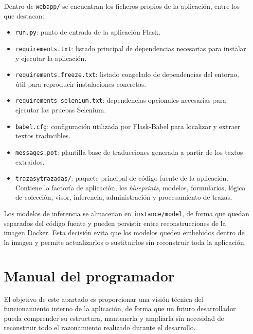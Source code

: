 Dentro de \texttt{webapp/} se encuentran los ficheros propios de la
aplicación, entre los que destacan:

\begin{itemize}
	\item \texttt{run.py}: punto de entrada de la aplicación Flask.
	
	\item \texttt{requirements.txt}: listado principal de dependencias necesarias para instalar y ejecutar la aplicación.
	
	\item \texttt{requirements.freeze.txt}: listado congelado de dependencias del entorno, útil para reproducir instalaciones concretas.
	
	\item \texttt{requirements-selenium.txt}: dependencias opcionales necesarias para ejecutar las pruebas Selenium.
	
	\item \texttt{babel.cfg}: configuración utilizada por Flask-Babel para localizar y extraer textos traducibles.
	
	\item \texttt{messages.pot}: plantilla base de traducciones generada a partir de los textos extraídos.
	
	\item \texttt{trazasytrazadas/}: paquete principal de código fuente de la aplicación. Contiene la factoría de aplicación, los \textit{blueprints}, modelos, formularios, lógica de colección, visor,
	inferencia, administración y procesamiento de trazas.
\end{itemize}

Los modelos de inferencia se almacenan en \texttt{instance/model}, de forma que quedan separados del código fuente y pueden persistir entre reconstrucciones de la imagen Docker. Esta decisión evita que los modelos queden embebidos dentro de la imagen y permite actualizarlos o sustituirlos sin reconstruir toda la aplicación.

\section{Manual del programador} 

El objetivo de este apartado es proporcionar una visión técnica del funcionamiento interno de la aplicación, de forma que un futuro desarrollador pueda comprender su estructura, mantenerla y ampliarla sin necesidad de reconstruir todo el razonamiento realizado durante el desarrollo. 

